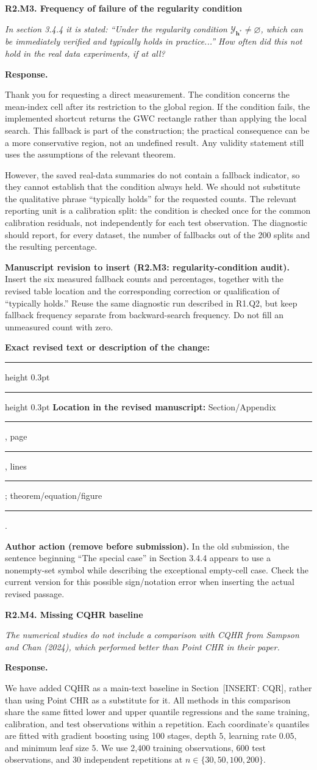 \documentclass[11pt]{article}
\numberwithin{equation}{section}
\newcommand{\pending}[1]{\textcolor{AuthorRed}{[INSERT: #1]}}
\newcommand{\authoraction}[1]{%
  \par\begingroup\small\color{AuthorRed}%
  \textbf{Author action (remove before submission).} #1\par\endgroup}
\newcommand{\reviewercomment}[2]{%
  \par\medskip\noindent\textbf{#1}\par\nopagebreak
  \begingroup\color{ReviewerBlue}\itshape #2\par\endgroup
  \noindent\textbf{Response.} }
\newcommand{\revisionblock}[2]{%
  \par\begingroup\color{AuthorRed}\small
  \textbf{Manuscript revision to insert (#1).} #2\par
  \textbf{Exact revised text or description of the change:}\par
  \vspace{0.35em}\hrule height 0.3pt\vspace{1.4em}
  \hrule height 0.3pt\vspace{0.6em}
  \textbf{Location in the revised manuscript:}
  Section/Appendix \rule{1.3cm}{0.3pt},
  page \rule{1cm}{0.3pt},
  lines \rule{1.3cm}{0.3pt};
  theorem/equation/figure \rule{1.4cm}{0.3pt}.
  \par\endgroup}
\newcommand{\SecCQR}{Section~\pending{CQR}} %
\begin{document}
\reviewercomment{R2.M3. Frequency of failure of the regularity condition}{%
In section 3.4.4 it is stated: ``Under the regularity condition
$\mathcal Y_{\bm h^*}\ne\varnothing$, which can be immediately
verified and typically holds in practice...'' How often did this
not hold in the real data experiments, if at all?}

Thank you for requesting a direct measurement. The condition concerns
the mean-index cell after its restriction to the global region. If
the condition fails, the implemented shortcut returns the GWC
rectangle rather than applying the local search. This fallback is
part of the construction; the practical consequence can be a more
conservative region, not an undefined result. Any validity statement
still uses the assumptions of the relevant theorem.

However, the saved real-data summaries do not contain a fallback
indicator, so they cannot establish that the condition always held.
We should not substitute the qualitative phrase ``typically holds''
for the requested counts. The relevant reporting unit is a
calibration split: the condition is checked once for the common
calibration residuals, not independently for each test observation.
The diagnostic should report, for every dataset, the number of
fallbacks out of the 200 splits and the resulting percentage.

\revisionblock{R2.M3: regularity-condition audit}{Insert the six
measured fallback counts and percentages, together with the revised
table location and the corresponding correction or qualification
of ``typically holds.'' Reuse the same diagnostic run described
in R1.Q2, but keep fallback frequency separate from backward-search
frequency. Do not fill an unmeasured count with zero.}

\authoraction{In the old submission, the sentence beginning ``The
special case'' in Section 3.4.4 appears to use a nonempty-set symbol
while describing the exceptional empty-cell case. Check the current
version for this possible sign/notation error when inserting the
actual revised passage.}

\reviewercomment{R2.M4. Missing CQHR baseline}{%
The numerical studies do not include a comparison with CQHR from
Sampson and Chan (2024), which performed better than Point CHR in
their paper.}

We have added CQHR as a main-text baseline in \SecCQR{}, rather than
using Point CHR as a substitute for it. All methods in this comparison
share the same fitted lower and upper quantile regressions and the
same training, calibration, and test observations within a repetition.
Each coordinate's quantiles are fitted with gradient boosting using
100 stages, depth $5$, learning rate $0.05$, and minimum leaf size $5$.
We use 2,400 training observations, 600 test observations, and 30
independent repetitions at $n\in\{30,50,100,200\}$.
\end{document}
